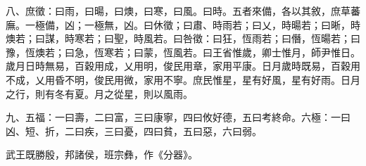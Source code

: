 \begin{pinyinscope}
八、庶徵：曰雨，曰暘，曰燠，曰寒，曰風。曰時。五者來備，各以其敘，庶草蕃廡。一極備，凶；一極無，凶。曰休徵；曰肅、時雨若；曰乂，時暘若；曰晰，時燠若；曰謀，時寒若；曰聖，時風若。曰咎徵：曰狂，恆雨若；曰僭，恆暘若；曰豫，恆燠若；曰急，恆寒若；曰蒙，恆風若。曰王省惟歲，卿士惟月，師尹惟日。歲月日時無易，百穀用成，乂用明，俊民用章，家用平康。日月歲時既易，百穀用不成，乂用昏不明，俊民用微，家用不寧。庶民惟星，星有好風，星有好雨。日月之行，則有冬有夏。月之從星，則以風雨。

九、五福：一曰壽，二曰富，三曰康寧，四曰攸好德，五曰考終命。六極：一曰凶、短、折，二曰疾，三曰憂，四曰貧，五曰惡，六曰弱。

武王既勝殷，邦諸侯，班宗彝，作《分器》。


\end{pinyinscope}
